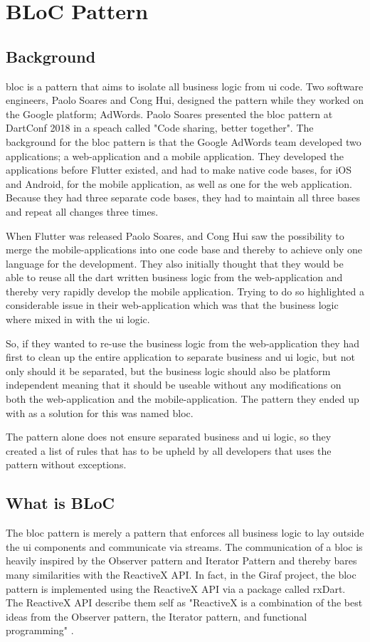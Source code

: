 \section{BLoC Pattern}

\subsection{Background}
\gls{bloc} is a pattern that aims to isolate all business logic from \gls{ui} code. Two software engineers, Paolo Soares and Cong Hui, designed the pattern while they worked on the Google platform; AdWords. Paolo Soares presented the \gls{bloc} pattern at DartConf 2018 in a speach called "Code sharing, better together". 
The background for the \gls{bloc} pattern is that the Google AdWords team  developed two applications; a web-application and a mobile application. 
They developed the applications before Flutter existed, and had to make native code bases, for iOS and Android, for the mobile application, as well as one for the web application. 
Because they had three separate code bases, they had to maintain all three bases and repeat all changes three times. 

When Flutter was released Paolo Soares, and Cong Hui saw the possibility to merge the mobile-applications into one code base and thereby to achieve only one language for the development. They also initially thought that they would be able to reuse all the dart written business logic from the web-application and thereby very rapidly develop the mobile application. Trying to do so highlighted a considerable issue in their web-application which was that the business logic where mixed in with the \gls{ui} logic.

So, if they wanted to re-use the business logic from the web-application they had first to clean up the entire application to separate business and \gls{ui} logic, but not only should it be separated, but the business logic should also be platform independent meaning that it should be useable without any modifications on both the web-application and the mobile-application. The pattern they ended up with as a solution for this was named \gls{bloc}.

The pattern alone does not ensure separated business and \gls{ui} logic, so they created a list of rules that has to be upheld by all developers that uses the pattern without exceptions.

\subsection{What is BLoC}
The \gls{bloc} pattern is merely a pattern that enforces all business logic to lay outside the \gls{ui} components and communicate via streams. The communication of a \gls{bloc} is heavily inspired by the Observer pattern and Iterator Pattern and thereby bares many similarities with the ReactiveX API. In fact, in the Giraf project, the \gls{bloc} pattern is implemented using the ReactiveX API via a package called rxDart. The ReactiveX API describe them self as "ReactiveX is a combination of the best ideas from the Observer pattern, the Iterator pattern, and functional programming" \cite{ReactiveXWebsite}.

